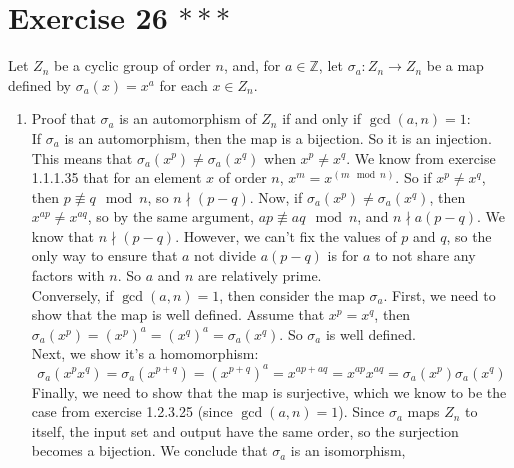 \documentclass{article}
\newcommand{\Z}{\mathbb{Z}}
\begin{document}
    \section*{Exercise 26 $***$}
    Let $Z_n$ be a cyclic group of order $n$, and, for $a \in \Z$,
    let $\sigma_a: Z_n \to Z_n$ be a map
    defined by $\sigma_a(x) = x^a$ for each $x \in Z_n$. \\
    \begin{enumerate}[label=\textbf{\alph*.}]
        \item 
            Proof that $\sigma_a$ is an automorphism of $Z_n$
            if and only if $\gcd(a, n) = 1$: \\
            If $\sigma_a$ is an automorphism,
            then the map is a bijection.
            So it is an injection.
            This means that $\sigma_a(x^p) \neq \sigma_a(x^q)$
            when $x^p \neq x^q$.
            We know from exercise 1.1.1.35 that for an element $x$ of
            order $n$, $x^m = x^{(m \mod n)}$.
            So if $x^p \neq x^q$, then $p \not\equiv q \mod n$,
            so $n \nmid (p - q)$.
            Now, if $\sigma_a(x^p) \neq \sigma_a(x^q)$,
            then $x^{ap} \neq x^{aq}$,
            so by the same argument, $ap \not\equiv aq \mod n$,
            and $n \nmid a(p - q)$.
            We know that $n \nmid (p-q)$.
            However, we can't fix the values of $p$ and $q$,
            so the only way to ensure that $a$ not divide $a(p - q)$
            is for $a$ to not share any factors with $n$.
            So $a$ and $n$ are relatively prime. \\
            Conversely, if $\gcd(a, n) = 1$,
            then consider the map $\sigma_a$.
            First, we need to show that the map is well defined.
            Assume that $x^p = x^q$,
            then $\sigma_a(x^p) = (x^p)^a = (x^q)^a = \sigma_a(x^q)$.
            So $\sigma_a$ is well defined. \\
            Next, we show it's a homomorphism:
            \[ \sigma_a(x^px^q) = \sigma_a(x^{p + q})
            = (x^{p + q})^a
            = x^{ap + aq}
            = x^{ap}x^{aq}
            = \sigma_a(x^p)\sigma_a(x^q) \]
            Finally, we need to show that the map is surjective,
            which we know to be the case from
            exercise 1.2.3.25 (since $\gcd(a, n) = 1$).
            Since $\sigma_a$ maps $Z_n$ to itself,
            the input set and output have the same order,
            so the surjection becomes a bijection.
            We conclude that $\sigma_a$ is an isomorphism,

\end{enumerate}
\end{document}
